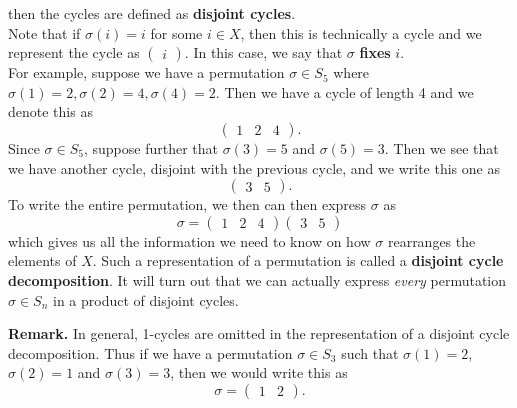 \begin{definition}
        then the cycles are defined as
        \textbf{disjoint cycles}.
        \\

        Note that if $\sigma(i) = i$ for some $i \in X$, then this is
        technically a cycle and we represent the cycle as $            \begin{pmatrix}
            i
        \end{pmatrix}.$ In this case, we say that $\sigma$ \textbf{fixes} $i$.
        \\

        For example, suppose we have a permutation $\sigma \in S_5$
        where $\sigma(1) = 2, \sigma(2) = 4, \sigma(4) = 2$. Then we
        have a cycle of length 4 and we denote this as 
        \[
            \begin{pmatrix}
                1 & 2 & 4
            \end{pmatrix}.
        \]
        Since $\sigma \in S_5$, suppose further
        that $\sigma(3) = 5$ and $\sigma(5) = 3$. Then we see that we
        have another cycle, disjoint with the previous cycle, and we write this one as
        \[
            \begin{pmatrix}
                3 & 5
            \end{pmatrix}.
        \]
        To write the entire permutation, we then can then express
        $\sigma$ as 
        \[
            \sigma =  \begin{pmatrix}
                1 & 2 & 4
            \end{pmatrix}
            \begin{pmatrix}
                3 & 5
            \end{pmatrix}
        \]
        which gives us all the information we need to know on how
        $\sigma$ rearranges the elements of $X$. Such a representation
        of a permutation is called a \textbf{disjoint cycle decomposition}. 
        It will turn out that
        we can actually express \textit{every} permutation $\sigma \in
        S_n$ in a product of disjoint cycles.
    \end{definition}
    \textbf{Remark.}
    In general, 1-cycles are omitted in the representation of a
    disjoint cycle decomposition. Thus if we have a permutation
    $\sigma \in S_3$ such that $\sigma(1) = 2$, $\sigma(2) = 1$ and
    $\sigma(3) = 3$, then we would write this as 
    \[
        \sigma = \begin{pmatrix}
            1 & 2
        \end{pmatrix}.
    \]
